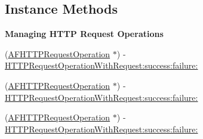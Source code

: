 \subsection*{Instance Methods}
\begin{Indent}\textbf{ Managing H\+T\+TP Request Operations}\par
{\em 

 

 }\begin{DoxyCompactItemize}
\item 
(\mbox{\hyperlink{interface_a_f_h_t_t_p_request_operation}{A\+F\+H\+T\+T\+P\+Request\+Operation}} $\ast$) -\/ \mbox{\hyperlink{interface_a_f_h_t_t_p_request_operation_manager_aa426a811463f329fb8c8b6577180b124}{H\+T\+T\+P\+Request\+Operation\+With\+Request\+:success\+:failure\+:}}
\item 
(\mbox{\hyperlink{interface_a_f_h_t_t_p_request_operation}{A\+F\+H\+T\+T\+P\+Request\+Operation}} $\ast$) -\/ \mbox{\hyperlink{interface_a_f_h_t_t_p_request_operation_manager_aa426a811463f329fb8c8b6577180b124}{H\+T\+T\+P\+Request\+Operation\+With\+Request\+:success\+:failure\+:}}
\item 
(\mbox{\hyperlink{interface_a_f_h_t_t_p_request_operation}{A\+F\+H\+T\+T\+P\+Request\+Operation}} $\ast$) -\/ \mbox{\hyperlink{interface_a_f_h_t_t_p_request_operation_manager_aa426a811463f329fb8c8b6577180b124}{H\+T\+T\+P\+Request\+Operation\+With\+Request\+:success\+:failure\+:}}
\end{DoxyCompactItemize}
\end{Indent}
